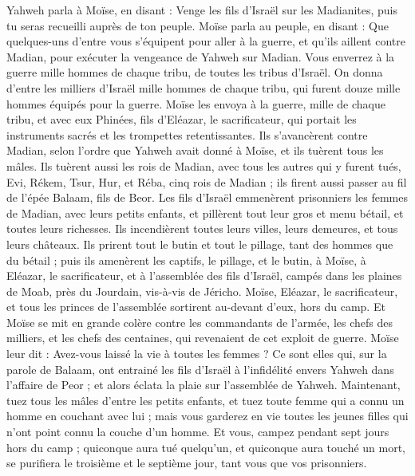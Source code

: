 \begin{multicols}{2}
\VerseOne{}Yahweh parla à Moïse, en disant :
Venge les fils d'Israël sur les Madianites, puis tu seras recueilli auprès de ton peuple.
Moïse parla au peuple, en disant : Que quelques-uns d'entre vous s'équipent pour aller à la guerre, et qu'ils aillent contre Madian, pour exécuter la vengeance de Yahweh sur Madian.
Vous enverrez à la guerre mille hommes de chaque tribu, de toutes les tribus d'Israël.
On donna d'entre les milliers d'Israël mille hommes de chaque tribu, qui furent douze mille hommes équipés pour la guerre.
Moïse les envoya à la guerre, mille de chaque tribu, et avec eux Phinées, fils d'Eléazar, le sacrificateur, qui portait les instruments sacrés et les trompettes retentissantes.
Ils s’avancèrent contre Madian, selon l’ordre que Yahweh avait donné à Moïse, et ils tuèrent tous les mâles.
Ils tuèrent aussi les rois de Madian, avec tous les autres qui y furent tués, Evi, Rékem, Tsur, Hur, et Réba, cinq rois de Madian ; ils firent aussi passer au fil de l'épée Balaam, fils de Beor.
Les fils d'Israël emmenèrent prisonniers les femmes de Madian, avec leurs petits enfants, et pillèrent tout leur gros et menu bétail, et toutes leurs richesses.
Ils incendièrent toutes leurs villes, leurs demeures, et tous leurs châteaux.
Ils prirent tout le butin et tout le pillage, tant des hommes que du bétail ;
puis ils amenèrent les captifs, le pillage, et le butin, à Moïse, à Eléazar, le sacrificateur, et à l'assemblée des fils d'Israël, campés dans les plaines de Moab, près du Jourdain, vis-à-vis de Jéricho.
Moïse, Eléazar, le sacrificateur, et tous les princes de l'assemblée sortirent au-devant d'eux, hors du camp.
Et Moïse se mit en grande colère contre les commandants de l'armée, les chefs des milliers, et les chefs des centaines, qui revenaient de cet exploit de guerre.
Moïse leur dit : Avez-vous laissé la vie à toutes les femmes ?
Ce sont elles qui, sur la parole de Balaam, ont entrainé les fils d'Israël à l’infidélité envers Yahweh dans l’affaire de Peor ; et alors éclata la plaie sur l'assemblée de Yahweh.
Maintenant, tuez tous les mâles d'entre les petits enfants, et tuez toute femme qui a connu un homme en couchant avec lui ;
mais vous garderez en vie toutes les jeunes filles qui n'ont point connu la couche d’un homme.
Et vous, campez pendant sept jours hors du camp ; quiconque aura tué quelqu'un, et quiconque aura touché un mort, se purifiera le troisième et le septième jour, tant vous que vos prisonniers.

\end{multicols}
